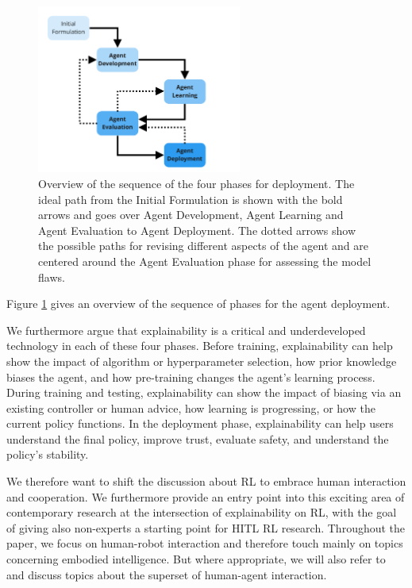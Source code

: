 \documentclass[twoside,11pt]{article}
\begin{document}
\begin{figure}[h]
    \centering
    \includegraphics[width=0.6\textwidth]{img/HITL Deployment Workflow.pdf}
    \caption{Overview of the sequence of the four phases for deployment. The ideal path from the Initial Formulation is shown with the bold arrows and goes over Agent Development, Agent Learning and Agent Evaluation to Agent Deployment. The dotted arrows show the possible paths for revising different aspects of the agent and are centered around the Agent Evaluation phase for assessing the model flaws.}
    \label{fig:Deployment_Workflow}
\end{figure}

Figure \ref{fig:Deployment_Workflow} gives an overview of the sequence of phases for the agent deployment.

We furthermore argue that explainability is a critical and underdeveloped technology in each of these four phases. Before training, explainability can help show the impact of algorithm or hyperparameter selection, how prior knowledge biases the agent, and how pre-training changes the agent's learning process. During training and testing, explainability can show the impact of biasing via an existing controller or human advice, how learning is progressing, or how the current policy functions. In the deployment phase, explainability can help users understand the final policy, improve trust, evaluate safety, and understand the policy's stability.

We therefore want to shift the discussion about RL to embrace human interaction and cooperation. We furthermore provide an entry point into this exciting area of contemporary research at the intersection of explainability on RL, with the goal of giving also non-experts a starting point for HITL RL research. Throughout the paper, we focus on human-robot interaction and therefore touch mainly on topics concerning embodied intelligence. But where appropriate, we will also refer to and discuss topics about the superset of human-agent interaction. 
\end{document}
